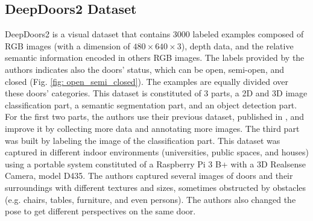 \subsection{DeepDoors2 Dataset}
DeepDoors2 \cite{deepdoors2} is a visual dataset that contains 3000 labeled examples composed of  RGB images (with a dimension of $480 \times 640 \times 3$), depth data, and the relative semantic information encoded in others RGB images. The labels provided by the authors indicates also the doors' status, which can be open, semi-open, and closed (Fig. \ref{fig: open_semi_closed}). The examples are equally divided over these doors' categories.  This dataset is constituted of 3 parts, a 2D and 3D image classification part, a semantic segmentation part, and an object detection part. For the first two parts, the authors use their previous
dataset, published in \cite{deepdoors1}, and improve it by collecting more data and annotating more images. The third part was built by labeling the image of the classification part. This dataset was captured in different indoor environments (universities, public spaces, and houses) using a portable system constituted of a Raspberry Pi 3 B+ with a 3D Realsense Camera, model D435. The authors captured several images of doors and their surroundings with different textures and sizes, sometimes obstructed by obstacles (e.g. chairs, tables, furniture, and even persons). The authors also changed the pose to get different perspectives on the same door. 

